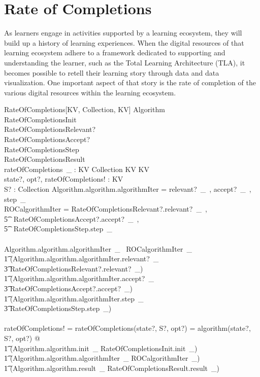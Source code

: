 \documentclass[../main.tex]{subfiles}
\begin{document}
\section{Rate of Completions}
As learners engage in activities supported by a learning ecosystem, they will build
up a history of learning experiences. When the digital resources of that learning ecosystem
adhere to a framework dedicated to supporting and understanding the
learner, such as the Total Learning Architecture (TLA), it becomes
possible to retell their learning story through data and data visualization. One important aspect of
that story is the rate of completion of the various digital resources within the learning ecosystem.

\begin{schema}{RateOfCompletions[KV, Collection, KV]}
  Algorithm \\
  RateOfCompletionsInit \\
  RateOfCompletionsRelevant? \\
  RateOfCompletionsAccept? \\
  RateOfCompletionsStep \\
  RateOfCompletionsResult \\
  rateOfCompletions~\_ : KV \cross Collection \cross KV \surj KV \\
  state?, opt?, rateOfCompletions! : KV \\
  S? : Collection
  \where
  Algorithm.algorithm.algorithmIter = \langle relevant?~\_~, accept?~\_~, step~\_ \rangle \\
  ROCalgorithmIter = \langle RateOfCompletionsRelevant?.relevant?~\_~, \\
  \t5 \ RateOfCompletionsAccept?.accept?~\_~, \\
  \t5 \ RateOfCompletionsStep.step~\_ \rangle \\ ~ \\

  Algorithm.algorithm.algorithmIter~\_~ \bindsto ROCalgorithmIter~\_~ \implies \\
  \t1 (Algorithm.algorithm.algorithmIter.relevant?~\_ \bindsto \\
  \t3 RateOfCompletionsRelevant?.relevant?~\_)  ~\land \\
  \t1 (Algorithm.algorithm.algorithmIter.accept?~\_ \bindsto \\
  \t3 RateOfCompletionsAccept?.accept?~\_) ~\land \\
  \t1 (Algorithm.algorithm.algorithmIter.step~\_ \bindsto \\
  \t3 RateOfCompletionsStep.step~\_) \\ ~ \\

  rateOfCompletions! = rateOfCompletions(state?, S?, opt?) = algorithm(state?, S?, opt?) @ \\
  \t1 (Algorithm.algorithm.init~\_ \bindsto RateOfCompletionsInit.init~\_) ~\land \\
  \t1 (Algorithm.algorithm.algorithmIter~\_ \bindsto ROCalgorithmIter~\_) ~ \land \\
  \t1 (Algorithm.algorithm.result~\_ \bindsto RateOfCompletionsResult.result~\_)
\end{schema}
\end{document}
